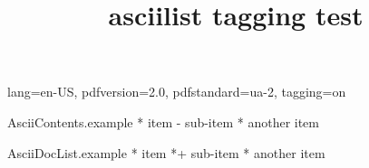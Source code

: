 \ifdefined\Uchar\RequirePackage{luatagging}\fi
\DocumentMetadata
  {
    lang=en-US,
    pdfversion=2.0,
    pdfstandard=ua-2,
    tagging=on
  }
\begin{filecontents*}[overwrite]{AsciiContents.example}
 * item
   - sub-item
 * another item
\end{filecontents*}
\begin{filecontents*}[overwrite]{AsciiDocList.example}
* item
*+ sub-item
* another item
\end{filecontents*}

\documentclass{article}
\usepackage{asciilist}

\title{asciilist tagging test}



\begin{enumerate}
\item bla
\item blub
\end{enumerate}



